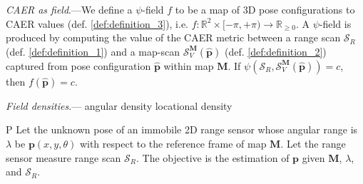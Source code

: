 \begin{definition}
  \label{def:definition_4} \textit{CAER as field}.---We define a $\psi$-field
  $f$ to be a map of 3D pose configurations to CAER values (def.
  \ref{def:definition_3}), i.e.
  $f: \mathbb{R}^2 \times [-\pi, +\pi) \rightarrow \mathbb{R}_{\geq 0}$.
  A $\psi$-field is produced by computing the value of the CAER metric between
  a range scan $\mathcal{S}_R$ (def. \ref{def:definition_1}) and a map-scan
  $\mathcal{S}_V^{\bm{M}}(\hat{\bm{p}})$ (def. \ref{def:definition_2}) captured from pose configuration
  $\hat{\bm{p}}$ within map $\bm{M}$.
  If $\psi(\mathcal{S}_R,\mathcal{S}_V^{\bm{M}}(\hat{\bm{p}})) = c$, then
  $f(\hat{\bm{p}}) = c$.
\end{definition}


\begin{definition}
  \label{def:definition_5} \textit{Field densities}.---
  angular density
  locational density
\end{definition}

\begin{customprb}{P}
  \label{prob:the_problem}
  Let the unknown pose of an immobile 2D range sensor whose angular range is
  $\lambda$ be $\bm{p}(x,y,\theta)$ with respect to the reference frame of map
  $\bm{M}$. Let the range sensor measure range scan $\mathcal{S}_R$. The
  objective is the estimation of $\bm{p}$ given $\bm{M}$, $\lambda$, and
  $\mathcal{S}_R$.
\end{customprb}
